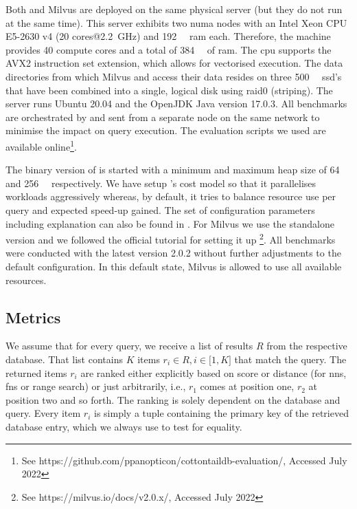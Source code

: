 Both \cottontail{} and Milvus are deployed on the same physical server (but they do not run at the same time). This server exhibits two \acrshort{numa} nodes with an Intel Xeon CPU E5-2630 v4 (20 cores@\SI{2.2}{\giga\hertz}) and \SI{192}{\giga\byte} \acrshort{ram} each. Therefore, the machine provides 40 compute cores and a total of \SI{384}{\giga\byte} of \acrshort{ram}. The \acrshort{cpu} supports the AVX2 instruction set extension, which allows for vectorised execution. The data directories from which Milvus and \cottontail{} access their data resides on three \SI{500}{\giga\byte} \acrshort{ssd}'s that have been combined into a single, logical disk using \acrshort{raid}0 (striping). The server runs Ubuntu 20.04 and the OpenJDK Java version 17.0.3. All benchmarks are orchestrated by and sent from a separate node on the same network to minimise the impact on query execution. The evaluation scripts we used are available online\footnote{See https://github.com/ppanopticon/cottontaildb-evaluation/, Accessed July 2022}.

The binary version of \cottontail{} is started with a minimum and maximum heap size of \SI{64}{\giga\byte} and \SI{256}{\giga\byte} respectively. We have setup \cottontail{}'s cost model so that it parallelises workloads aggressively whereas, by default, it tries to balance resource use per query and expected speed-up gained. The set of configuration parameters including explanation can also be found in . For Milvus we use the standalone version and we followed the official tutorial for setting it up \footnote{See https://milvus.io/docs/v2.0.x/, Accessed July 2022}. All benchmarks were conducted with the latest version 2.0.2 without further adjustments to the default configuration. In this default state, Milvus is allowed to use all available resources.

\subsection{Metrics}

We assume that for every query, we receive a list of results $R$ from the respective database. That list contains $K$ items $r_i \in R, i \in \lbrack 1, K  \rbrack $ that match the query. The returned items $r_i$ are ranked either explicitly based on score or distance (for \acrshort{nns}, \acrshort{fns} or range search) or just arbitrarily, i.e., $r_1$ comes at position one, $r_2$ at position two and so forth. The ranking is solely dependent on the database and query. Every item $r_i$ is simply a tuple containing the primary key of the retrieved database entry, which we always use to test for equality.

